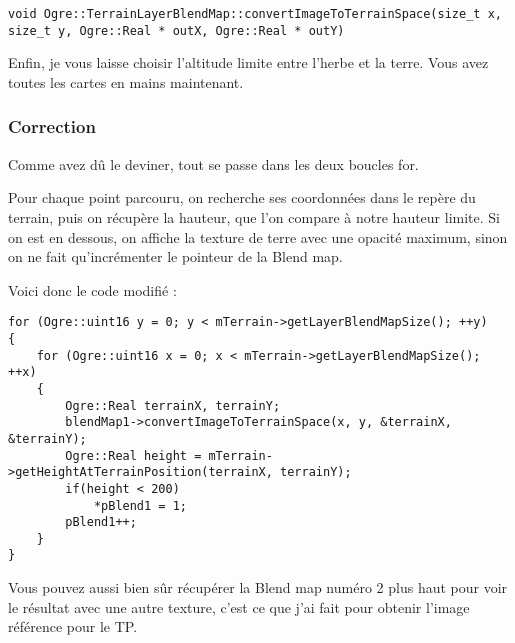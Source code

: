 \documentclass[10pt,a4paper]{report}
\begin{document}
\begin{lstlisting}[caption={M\'ethode convertImageToTerrainSpace pour convertir les coordonn\'ees de l'image en coordonn\'ees du terrain}]
void Ogre::TerrainLayerBlendMap::convertImageToTerrainSpace(size_t x, size_t y, Ogre::Real * outX, Ogre::Real * outY)
\end{lstlisting}


Enfin, je vous laisse choisir l'altitude limite entre l'herbe et la terre. Vous avez toutes les cartes en mains maintenant.

























\subsubsection{Correction}

Comme avez d\^u le deviner, tout se passe dans les deux boucles for.

Pour chaque point parcouru, on recherche ses coordonn\'ees dans le rep\`ere du terrain, puis on r\'ecup\`ere la hauteur, que l'on compare \`a notre hauteur limite. Si on est en dessous, on affiche la texture de terre avec une opacit\'e maximum, sinon on ne fait qu'incr\'ementer le pointeur de la Blend map.

Voici donc le code modifi\'e :

\begin{lstlisting}[caption={Attribution de la transparence d\'esir\'ee sur tous les points du calque selon leur position}]
for (Ogre::uint16 y = 0; y < mTerrain->getLayerBlendMapSize(); ++y)
{
    for (Ogre::uint16 x = 0; x < mTerrain->getLayerBlendMapSize(); ++x)
    {
        Ogre::Real terrainX, terrainY;
        blendMap1->convertImageToTerrainSpace(x, y, &terrainX, &terrainY);
        Ogre::Real height = mTerrain->getHeightAtTerrainPosition(terrainX, terrainY);
        if(height < 200)
            *pBlend1 = 1;
        pBlend1++;
    }
}
\end{lstlisting}

Vous pouvez aussi bien s\^ur r\'ecup\'erer la Blend map num\'ero 2 plus haut pour voir le r\'esultat avec une autre texture, c'est ce que j'ai fait pour obtenir l'image r\'ef\'erence pour le TP.
\end{document}
